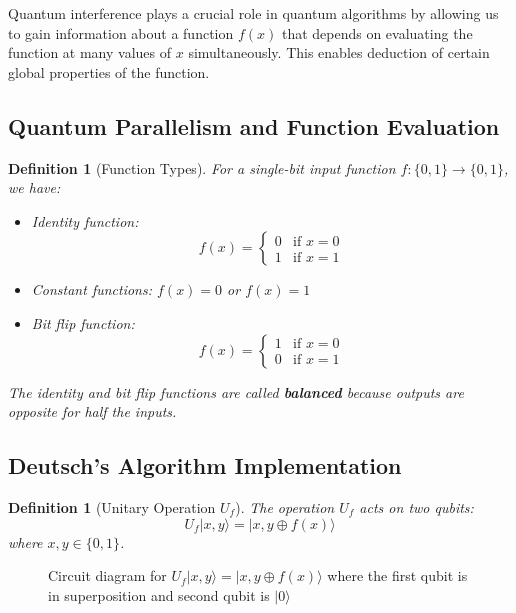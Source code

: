 \documentclass{article}
\newtheorem{definition}[theorem]{Definition}
\begin{document}
Quantum interference plays a crucial role in quantum algorithms by allowing us to gain information about a function $f(x)$ that depends on evaluating the function at many values of $x$ simultaneously. This enables deduction of certain global properties of the function.

\subsection{Quantum Parallelism and Function Evaluation}
\begin{definition}[Function Types]
For a single-bit input function $f: \{0,1\} \to \{0,1\}$, we have:
\begin{itemize}
    \item Identity function:
    \[
    f(x) = \begin{cases}
    0 & \text{if } x = 0 \\
    1 & \text{if } x = 1
    \end{cases}
    \]
    \item Constant functions: $f(x) = 0$ or $f(x) = 1$
    \item Bit flip function:
    \[
    f(x) = \begin{cases}
    1 & \text{if } x = 0 \\
    0 & \text{if } x = 1
    \end{cases}
    \]
\end{itemize}
The identity and bit flip functions are called \textbf{balanced} because outputs are opposite for half the inputs.
\end{definition}

\subsection{Deutsch's Algorithm Implementation}
\begin{definition}[Unitary Operation $U_f$]
The operation $U_f$ acts on two qubits:
\[
U_f|x,y\rangle = |x, y \oplus f(x)\rangle
\]
where $x,y \in \{0,1\}$.
\end{definition}


\begin{figure}[h]
\centering
{}
\caption{Circuit diagram for $U_f|x,y\rangle = |x,y \oplus f(x)\rangle$ where the first qubit is in superposition and second qubit is $|0\rangle$}
\end{figure}
\end{document}
